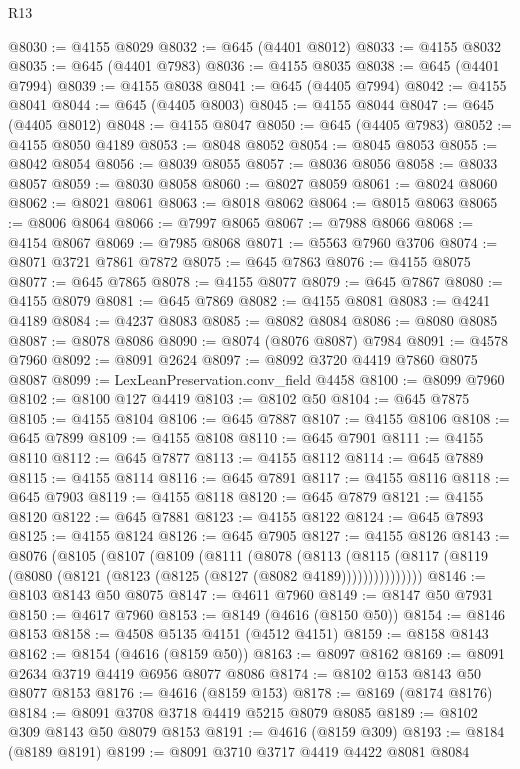 \begin{lexlean}{R13}
\begin{coremodule}
@8030 := @4155 @8029
@8032 := @645 (@4401 @8012)
@8033 := @4155 @8032
@8035 := @645 (@4401 @7983)
@8036 := @4155 @8035
@8038 := @645 (@4401 @7994)
@8039 := @4155 @8038
@8041 := @645 (@4405 @7994)
@8042 := @4155 @8041
@8044 := @645 (@4405 @8003)
@8045 := @4155 @8044
@8047 := @645 (@4405 @8012)
@8048 := @4155 @8047
@8050 := @645 (@4405 @7983)
@8052 := @4155 @8050 @4189
@8053 := @8048 @8052
@8054 := @8045 @8053
@8055 := @8042 @8054
@8056 := @8039 @8055
@8057 := @8036 @8056
@8058 := @8033 @8057
@8059 := @8030 @8058
@8060 := @8027 @8059
@8061 := @8024 @8060
@8062 := @8021 @8061
@8063 := @8018 @8062
@8064 := @8015 @8063
@8065 := @8006 @8064
@8066 := @7997 @8065
@8067 := @7988 @8066
@8068 := @4154 @8067
@8069 := @7985 @8068
@8071 := @5563 @7960 @3706
@8074 := @8071 @3721 @7861 @7872
@8075 := @645 @7863
@8076 := @4155 @8075
@8077 := @645 @7865
@8078 := @4155 @8077
@8079 := @645 @7867
@8080 := @4155 @8079
@8081 := @645 @7869
@8082 := @4155 @8081
@8083 := @4241 @4189
@8084 := @4237 @8083
@8085 := @8082 @8084
@8086 := @8080 @8085
@8087 := @8078 @8086
@8090 := @8074 (@8076 @8087) @7984
@8091 := @4578 @7960
@8092 := @8091 @2624
@8097 := @8092 @3720 @4419 @7860 @8075 @8087
@8099 := LexLeanPreservation.conv_field @4458
@8100 := @8099 @7960
@8102 := @8100 @127 @4419
@8103 := @8102 @50
@8104 := @645 @7875
@8105 := @4155 @8104
@8106 := @645 @7887
@8107 := @4155 @8106
@8108 := @645 @7899
@8109 := @4155 @8108
@8110 := @645 @7901
@8111 := @4155 @8110
@8112 := @645 @7877
@8113 := @4155 @8112
@8114 := @645 @7889
@8115 := @4155 @8114
@8116 := @645 @7891
@8117 := @4155 @8116
@8118 := @645 @7903
@8119 := @4155 @8118
@8120 := @645 @7879
@8121 := @4155 @8120
@8122 := @645 @7881
@8123 := @4155 @8122
@8124 := @645 @7893
@8125 := @4155 @8124
@8126 := @645 @7905
@8127 := @4155 @8126
@8143 := @8076
    (@8105
      (@8107
        (@8109
          (@8111
            (@8078
              (@8113
                (@8115 (@8117 (@8119 (@8080 (@8121 (@8123 (@8125 (@8127 (@8082 @4189)))))))))))))))
@8146 := @8103 @8143 @50 @8075
@8147 := @4611 @7960
@8149 := @8147 @50 @7931
@8150 := @4617 @7960
@8153 := @8149 (@4616 (@8150 @50))
@8154 := @8146 @8153
@8158 := @4508 @5135 @4151 (@4512 @4151)
@8159 := @8158 @8143
@8162 := @8154 (@4616 (@8159 @50))
@8163 := @8097 @8162
@8169 := @8091 @2634 @3719 @4419 @6956 @8077 @8086
@8174 := @8102 @153 @8143 @50 @8077 @8153
@8176 := @4616 (@8159 @153)
@8178 := @8169 (@8174 @8176)
@8184 := @8091 @3708 @3718 @4419 @5215 @8079 @8085
@8189 := @8102 @309 @8143 @50 @8079 @8153
@8191 := @4616 (@8159 @309)
@8193 := @8184 (@8189 @8191)
@8199 := @8091 @3710 @3717 @4419 @4422 @8081 @8084

\end{coremodule}
\end{lexlean}
